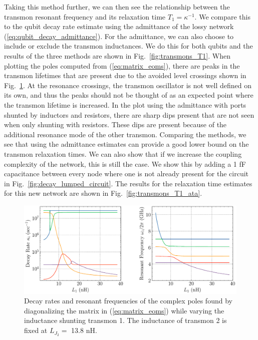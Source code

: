 Taking this method further, we can then see the relationship between the transmon resonant frequency and its relaxation time $T_1 = \kappa^{-1}$. We compare this to the qubit decay rate estimate using the admittance of the lossy network (\ref{eq:qubit_decay_admittance}). For the admittance, we can also choose to include or exclude the transmon inductances. We do this for both qubits and the results of the three methods are shown in Fig.\ \ref{fig:transmons_T1}. When plotting the poles computed from (\ref{eq:matrix_eoms}), there are peaks in the transmon lifetimes that are present due to the avoided level crossings shown in Fig.\ \ref{fig:poles_real_imag}. At the resonance crossings, the transmon oscillator is not well defined on its own, and thus the peaks should not be thought of as an expected point where the transmon lifetime is increased. In the plot using the admittance with ports shunted by inductors and resistors, there are sharp dips present that are not seen when only shunting with resistors. These dips are present because of the additional resonance mode of the other transmon. Comparing the methods, we see that using the admittance estimates can provide a good lower bound on the transmon relaxation times. We can also show that if we increase the coupling complexity of the network, this is still the case. We show this by adding a 1 fF capacitance between every node where one is not already present for the circuit in Fig.\ \ref{fig:decay_lumped_circuit}. The results for the relaxation time estimates for this new network are shown in Fig.\ \ref{fig:transmons_T1_ata}.

\begin{figure}[!h]
    \centering
    \includegraphics[width=\textwidth]{figures/poles_real_imag.pdf}
    \caption{Decay rates and resonant frequencies of the complex poles found by diagonalizing the matrix in (\ref{eq:matrix_eoms}) while varying the inductance shunting transmon 1. The inductance of transmon 2 is fixed at $L_{J_2}=$ 13.8 nH.}
    \label{fig:poles_real_imag}
\end{figure}

